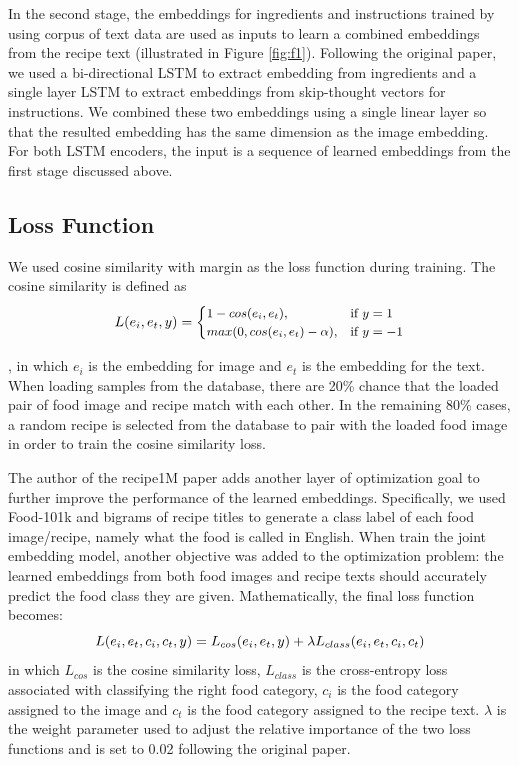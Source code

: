 \documentclass[10pt,twocolumn,letterpaper]{article}
\begin{document}
In the second stage, the embeddings for ingredients and instructions trained by using corpus of text data are used as inputs to learn a combined embeddings from the recipe text (illustrated in Figure \ref{fig:f1}).  Following the original paper, we used a bi-directional LSTM to extract embedding from ingredients and a single layer LSTM to extract embeddings from skip-thought vectors for instructions.  We combined these two embeddings using a single linear layer so that the resulted embedding has the same dimension as the image embedding.  For both LSTM encoders, the input is a sequence of learned embeddings from the first stage discussed above.

\subsection{Loss Function}
We used cosine similarity with margin as the loss function during training.  The cosine similarity is defined as
\[
\small
L(e_i, e_t, y) = 
\begin{cases}
	1 - cos(e_i, e_t), & \text{if } y = 1 \\
	max(0, cos(e_i, e_t) - \alpha), & \text{if } y = -1
\end{cases}
\]

, in which \(e_i\) is the embedding for image and \(e_t\) is the embedding for the text.  When loading samples from the database, there are 20\% chance that the loaded pair of food image and recipe match with each other.  In the remaining 80\% cases, a random recipe is selected from the database to pair with the loaded food image in order to train the cosine similarity loss.

The author of the recipe1M paper adds another layer of optimization goal to further improve the performance of the learned embeddings.  Specifically, we used Food-101k and bigrams of recipe titles to generate a class label of each food image/recipe, namely what the food is called in English.  When train the joint embedding model, another objective was added to the optimization problem: the learned embeddings from both food images and recipe texts should accurately predict the food class they are given.  Mathematically, the final loss function becomes:
\[
\small
L(e_i, e_t, c_i, c_t, y) = L_{cos}(e_i, e_t, y) + {\lambda}L_{class}(e_i, e_t, c_i, c_t)
\]
in which \(L_{cos}\) is the cosine similarity loss, \(L_{class}\) is the cross-entropy loss associated with classifying the right food category, \(c_i\) is the food category assigned to the image and \(c_t\) is the food category assigned to the recipe text.  \(\lambda\) is the weight parameter used to adjust the relative importance of the two loss functions and is set to 0.02 following the original paper.
\end{document}
